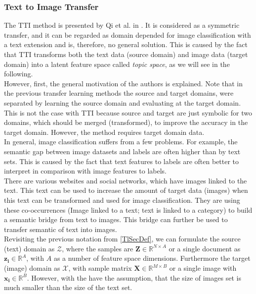 \subsubsection{Text to Image Transfer}
The \acs{TTI} method is presented by Qi et al. in \cite{Qi.2011}.
It is considered as a symmetric transfer, and it can be regarded as domain depended for image classification with a text extension and is, therefore, no general solution.\cite[p. 22]{Weiss.2016}
This is caused by the fact that \ac{TTI} transforms both the text data (source domain) and image data (target domain) into a latent feature space called \textit{topic space}, as we will see in the following.\\
However, first, the general motivation of the authors is explained.
Note that in the previous transfer learning methods the source and target domains, were separated by learning the source domain and evaluating at the target domain.
This is not the case with \acs{TTI} because source and target are just symbolic for two domains, which should be merged (transformed), to improve the accuracy in the target domain.
However, the method requires target domain data.\cite{Qi.2011}\\
In general, image classification suffers from a few problems.
For example, the semantic gap between image datasets and labels are often higher than by text sets.
This is caused by the fact that text features to labels are often better to interpret in comparison with image features to labels.\cite{Qi.2011}\\
There are various websites and social networks, which have images linked to the text.
This text can be used to increase the amount of target data (images) when this text can be transformed and used for image classification.
They are using these co-occurrences (Image linked to a text; text is linked to a category) to build a semantic bridge from text to images.
This bridge can further be used to transfer semantic of text into images.\cite{Qi.2011}\\
Revisiting the previous notation from \ref{TlSecDef}, we can formulate the source (text) domain as $\mathcal{Z}$, where the samples are $\mathbf{Z} \in \mathbb{R}^{N\times A}$ or a single document as $\mathbf{z_i}\in \mathbb{R}^A$, with $A$ as a number of feature space dimensions.
Furthermore the target (image) domain as $\mathcal{X}$, with sample matrix $\mathbf{X} \in \mathbb{R}^{M\times B}$ or a single image with $\mathbf{x_i}\in\mathbb{R}^B$.
However, with the have the assumption, that the size of images set is much smaller than the size of the text set.\cite{Qi.2011}\\
